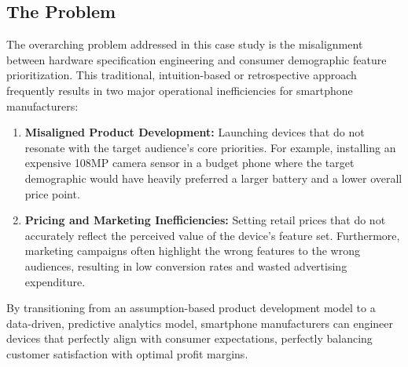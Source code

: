 \documentclass[12pt,a4paper]{article}
\begin{document}
\subsection{The Problem}
The overarching problem addressed in this case study is the misalignment between hardware specification engineering and consumer demographic feature prioritization. This traditional, intuition-based or retrospective approach frequently results in two major operational inefficiencies for smartphone manufacturers:
\begin{enumerate}
    \item \textbf{Misaligned Product Development:} Launching devices that do not resonate with the target audience's core priorities. For example, installing an expensive 108MP camera sensor in a budget phone where the target demographic would have heavily preferred a larger battery and a lower overall price point.
    \item \textbf{Pricing and Marketing Inefficiencies:} Setting retail prices that do not accurately reflect the perceived value of the device's feature set. Furthermore, marketing campaigns often highlight the wrong features to the wrong audiences, resulting in low conversion rates and wasted advertising expenditure.
\end{enumerate}

By transitioning from an assumption-based product development model to a data-driven, predictive analytics model, smartphone manufacturers can engineer devices that perfectly align with consumer expectations, perfectly balancing customer satisfaction with optimal profit margins.
\end{document}
